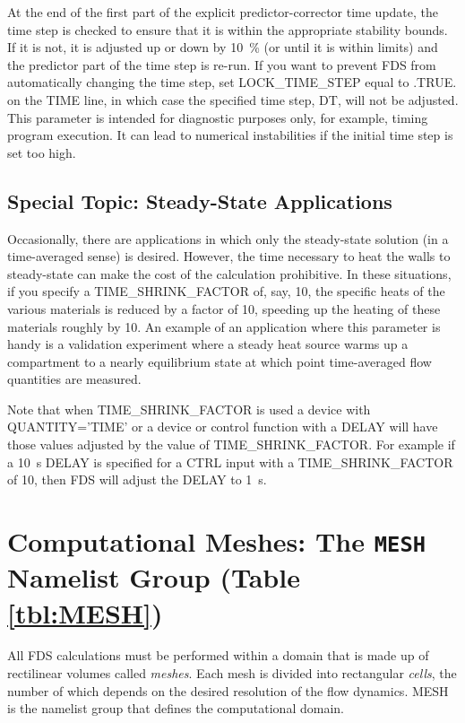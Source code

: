 \documentclass[11pt]{book}
\begin{document}
At the end of the first part of the explicit predictor-corrector time update, the time step is checked to ensure that it is within the appropriate stability bounds. If it is not, it is adjusted up or down by 10~\% (or until it is within limits) and the predictor part of the time step is re-run. If you want to prevent FDS from automatically changing the time step, set {\ct LOCK\_TIME\_STEP} equal to {\ct .TRUE.} on the {\ct TIME} line, in which case the specified time step, {\ct DT}, will not be adjusted. This parameter is intended for diagnostic purposes only, for example, timing program execution. It can lead to numerical instabilities if the initial time step is set too high.


\subsection{Special Topic: Steady-State Applications}
\label{info:steady_state}

Occasionally, there are applications in which only the steady-state solution (in a time-averaged sense) is desired. However, the time necessary to
heat the walls to steady-state can make the cost of the calculation prohibitive. In these situations, if you specify a
{\ct TIME\_SHRINK\_FACTOR} of, say, 10, the specific heats of the various materials is reduced by a factor of 10, speeding up the heating
of these materials roughly by 10. An example of an application where this parameter is handy is a validation experiment where a steady heat source
warms up a compartment to a nearly equilibrium state at which point time-averaged flow quantities are measured.

Note that when {\ct TIME\_SHRINK\_FACTOR} is used a device with {\ct QUANTITY='TIME'} or a device or control function with a {\ct DELAY} will have those values adjusted by the value of {\ct TIME\_SHRINK\_FACTOR}.  For example if a 10~s {\ct DELAY} is specified for a {\ct CTRL} input with a {\ct TIME\_SHRINK\_FACTOR} of 10, then FDS will adjust the {\ct DELAY} to 1~s.

\newpage

\section{Computational Meshes: The \texorpdfstring{{\tt MESH}}{MESH} Namelist Group (Table \ref{tbl:MESH})}
\label{info:MESH}

All FDS calculations must be performed within a domain that is made up
of rectilinear volumes called {\em meshes}. Each mesh is divided into rectangular {\em cells},
the number of which depends on the desired resolution of the flow dynamics.
{\ct MESH} is the namelist group that defines the computational domain.
\end{document}
